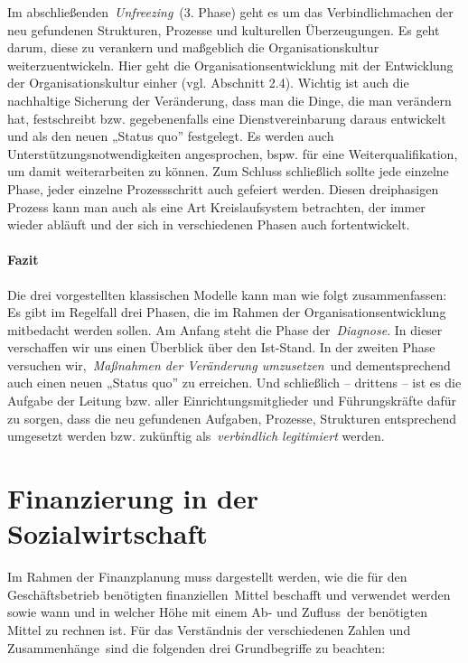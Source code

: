 \documentclass[
  letterpaper,
]{book}
\begin{document}
Im abschließenden~\emph{Unfreezing}~(3. Phase) geht es um das
Verbindlichmachen der neu gefundenen Strukturen, Prozesse und
kulturellen Überzeugungen. Es geht darum, diese zu verankern und
maßgeblich die Organisationskultur weiterzuentwickeln. Hier geht die
Organisationsentwicklung mit der Entwicklung der Organisationskultur
einher (vgl. Abschnitt 2.4). Wichtig ist auch die nachhaltige Sicherung
der Veränderung, dass man die Dinge, die man verändern hat, festschreibt
bzw. gegebenenfalls eine Dienstvereinbarung daraus entwickelt und als
den neuen „Status quo'' festgelegt. Es werden auch
Unterstützungsnotwendigkeiten angesprochen, bspw. für eine
Weiterqualifikation, um damit weiterarbeiten zu können. Zum Schluss
schließlich sollte jede einzelne Phase, jeder einzelne Prozessschritt
auch gefeiert werden. Diesen dreiphasigen Prozess kann man auch als eine
Art Kreislaufsystem betrachten, der immer wieder abläuft und der sich in
verschiedenen Phasen auch fortentwickelt.

\subsubsection{Fazit}\label{fazit}

Die drei vorgestellten klassischen Modelle kann man wie folgt
zusammenfassen: Es gibt im Regelfall drei Phasen, die im Rahmen der
Organisationsentwicklung mitbedacht werden sollen. Am Anfang steht die
Phase der~\emph{Diagnose}. In dieser verschaffen wir uns einen Überblick
über den Ist-Stand. In der zweiten Phase versuchen wir,~\emph{Maßnahmen
der Veränderung umzusetzen}~und dementsprechend auch einen neuen „Status
quo'' zu erreichen. Und schließlich -- drittens -- ist es die Aufgabe
der Leitung bzw. aller Einrichtungsmitglieder und Führungskräfte dafür
zu sorgen, dass die neu gefundenen Aufgaben, Prozesse, Strukturen
entsprechend umgesetzt werden bzw. zukünftig als~\emph{verbindlich
legitimiert} werden.

\chapter{Finanzierung in der
Sozialwirtschaft}\label{finanzierung-sozialwirtschaft}

Im Rahmen der Finanzplanung muss dargestellt werden, wie die für den
Geschäftsbetrieb benötigten finanziellen~Mittel beschafft und verwendet
werden sowie wann und in welcher Höhe mit einem Ab- und Zufluss~der
benötigten Mittel zu rechnen ist. Für das Verständnis der verschiedenen
Zahlen und Zusammenhänge~sind die folgenden drei Grundbegriffe zu
beachten:
\end{document}
